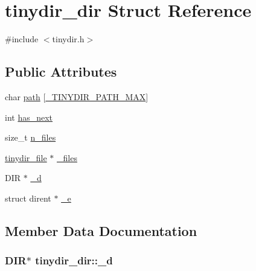 \hypertarget{structtinydir__dir}{}\section{tinydir\+\_\+dir Struct Reference}
\label{structtinydir__dir}


{\ttfamily \#include $<$tinydir.\+h$>$}

\subsection*{Public Attributes}
\begin{DoxyCompactItemize}
\item 
char \hyperlink{structtinydir__dir_a680e146c5cad2c591c658ce65c01f204}{path} \mbox{[}\hyperlink{tinydir_8h_a0851f369d026104769d8a016741f2bc2}{\+\_\+\+T\+I\+N\+Y\+D\+I\+R\+\_\+\+P\+A\+T\+H\+\_\+\+M\+A\+X}\mbox{]}
\item 
int \hyperlink{structtinydir__dir_a199eae7f7fa402e1c3f5195de9beb15b}{has\+\_\+next}
\item 
size\+\_\+t \hyperlink{structtinydir__dir_afcb78c8c7847fd984faf7cbb16cf9768}{n\+\_\+files}
\item 
\hyperlink{structtinydir__file}{tinydir\+\_\+file} $\ast$ \hyperlink{structtinydir__dir_aa410f654a220b8dbe75f492b0285594b}{\+\_\+files}
\item 
D\+I\+R $\ast$ \hyperlink{structtinydir__dir_af79657e3152541d6cb3953f0d2d16e22}{\+\_\+d}
\item 
struct dirent $\ast$ \hyperlink{structtinydir__dir_afb1d54c34055f8feb5c1079482417db1}{\+\_\+e}
\end{DoxyCompactItemize}


\subsection{Member Data Documentation}
\hypertarget{structtinydir__dir_af79657e3152541d6cb3953f0d2d16e22}{}
\subsubsection[{\+\_\+d}]{\setlength{\rightskip}{0pt plus 5cm}D\+I\+R$\ast$ tinydir\+\_\+dir\+::\+\_\+d}\label{structtinydir__dir_af79657e3152541d6cb3953f0d2d16e22}
\hypertarget{structtinydir__dir_afb1d54c34055f8feb5c1079482417db1}{}
